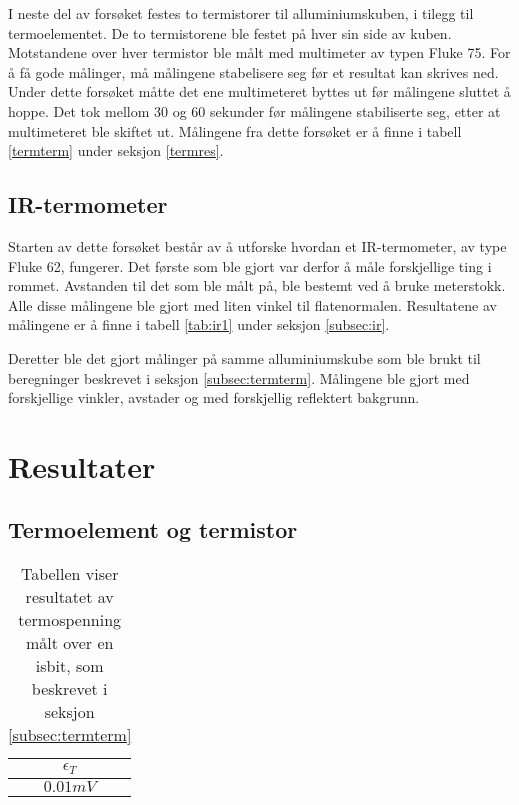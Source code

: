 \documentclass[a4paper,norsk,12pt,oneside]{article}
\begin{document}
I neste del av forsøket festes to termistorer til alluminiumskuben, i tilegg til 
termoelementet. De to termistorene ble festet på hver sin side av kuben. Motstandene over 
hver termistor ble målt med multimeter av typen Fluke 75. For å få gode målinger, må 
målingene stabelisere seg før et resultat kan skrives ned. Under dette forsøket måtte 
det ene multimeteret byttes ut før målingene sluttet å hoppe. Det tok mellom 30 og 
60 sekunder før målingene stabiliserte seg, etter at multimeteret ble skiftet ut. 
Målingene fra dette forsøket er å finne i tabell \ref{termterm} under seksjon
\ref{termres}. 

\subsection{IR-termometer}\label{subsec:ireksperiment}

Starten av dette forsøket består av å utforske hvordan et IR-termometer, av type Fluke 62, 
fungerer. Det første som ble gjort var derfor å måle forskjellige ting i rommet. Avstanden 
til det som ble målt på, ble bestemt ved å bruke meterstokk. Alle disse målingene ble 
gjort med liten vinkel til flatenormalen. Resultatene av målingene er å finne i tabell 
\ref{tab:ir1} under seksjon \ref{subsec:ir}.

Deretter ble det gjort målinger på samme alluminiumskube som ble brukt til beregninger 
beskrevet i seksjon \ref{subsec:termterm}. Målingene ble gjort med forskjellige vinkler, avstader og med forskjellig reflektert bakgrunn.    



\section{Resultater}

\subsection{Termoelement og termistor}\label{subsec:termres}

\begin{table}[H]  
  \begin{center}
      \caption{Tabellen viser resultatet av termospenning målt over en isbit, som 
          beskrevet i seksjon \ref{subsec:termterm} \label{tab:isbit}}
  \begin{tabular}{|c|} \hline
      \textbf{\(\epsilon_T\)} \\ \hline
  \(0.01 mV\)\\ \hline
  \end{tabular}
  \end{center}
\end{table}  
\end{document}
